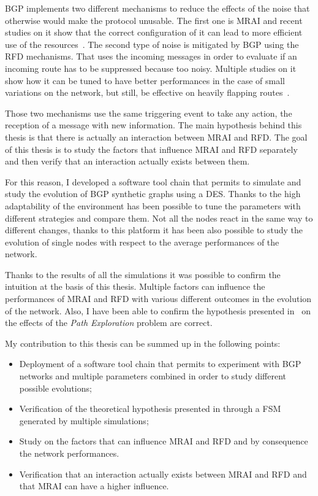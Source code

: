 \ac{BGP} implements two different mechanisms to reduce the effects of the
noise that otherwise would make the protocol unusable.
The first one is \ac{MRAI} and recent studies on it show that the correct
configuration of it can lead to more efficient use of the
resources~\cite{griffin2001experimental,fabrikant2011there,deshpande2004impact,milani2020improving}.
The second type of noise is mitigated by \ac{BGP} using the \ac{RFD} mechanisms.
That uses the incoming messages in order to evaluate if an incoming route has
to be suppressed because too noisy.
Multiple studies on it show how it can be tuned to have better performances in
the case of small variations on the network, but still, be effective on heavily
flapping routes~\cite{mao2002route,gray2020bgp,rfc7196}.

Those two mechanisms use the same triggering event to take any action, the reception
of a message with new information.
The main hypothesis behind this thesis is that there is actually an interaction
between \ac{MRAI} and \ac{RFD}.
The goal of this thesis is to study the factors that influence \ac{MRAI} and
\ac{RFD} separately and then verify that an interaction actually exists between
them.

For this reason, I developed a software tool chain that permits to simulate and
study the evolution of \ac{BGP} synthetic graphs using a \ac{DES}.
Thanks to the high adaptability of the environment has been possible to tune
the parameters with different strategies and compare them.
Not all the nodes react in the same way to different changes, thanks to this
platform it has been also possible to study the evolution of single nodes
with respect to the average performances of the network.

Thanks to the results of all the simulations it was possible to confirm
the intuition at the basis of this thesis.
Multiple factors can influence the performances of \ac{MRAI} and \ac{RFD} with
various different outcomes in the evolution of the network.
Also, I have been able to confirm the hypothesis presented in~\cite{griffinFSM,fabrikant2011there}
on the effects of the \textit{Path Exploration} problem are correct.

My contribution to this thesis can be summed up in the following points:
\begin{itemize}
		\item Deployment of a software tool chain that permits to experiment
		with \ac{BGP} networks and multiple parameters combined in order to study
		different possible evolutions;
		\item Verification of the theoretical hypothesis presented in
		\cite{griffinFSM,fabrikant2011there} through a \ac{FSM} generated by
		multiple simulations;
		\item Study on the factors that can influence \ac{MRAI} and \ac{RFD} and
		by consequence the network performances.
		\item Verification that an interaction actually exists between \ac{MRAI}
		and \ac{RFD} and that \ac{MRAI} can have a higher influence.
\end{itemize}

